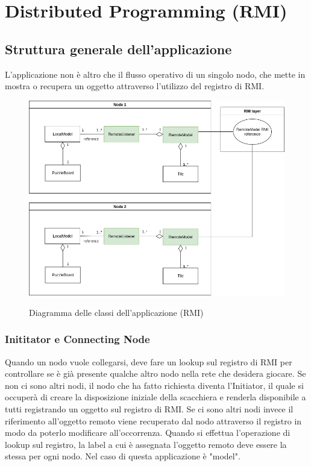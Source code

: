 \chapter{Distributed Programming (RMI)}

\section{Struttura generale dell'applicazione}
L'applicazione non è altro che il flusso operativo di un singolo nodo, che mette in mostra o recupera un oggetto attraverso l'utilizzo del registro di RMI.
\begin{figure}[H]
	\begin{center}
		\includegraphics[width=0.8\linewidth]{img/part-2/class-rmi.png}
		\label{fig:class-rmi}
	\end{center}
	\caption{Diagramma delle classi dell'applicazione (RMI)}
\end{figure}

\subsection{Inititator e Connecting Node}
Quando un nodo vuole collegarsi, deve fare un lookup sul registro di RMI per controllare se è già presente qualche altro nodo nella rete che desidera giocare. Se non ci sono altri nodi, il nodo che ha fatto richiesta diventa l'Initiator, il quale si occuperà di creare la disposizione iniziale della scacchiera e renderla disponibile a tutti registrando un oggetto sul registro di RMI.\newline
Se ci sono altri nodi invece il riferimento all'oggetto remoto viene recuperato dal nodo attraverso il registro in modo da poterlo modificare all'occorrenza. Quando si effettua l'operazione di lookup sul registro, la label a cui è assegnata l'oggetto remoto deve essere la stessa per ogni nodo. Nel caso di questa applicazione è "model".
